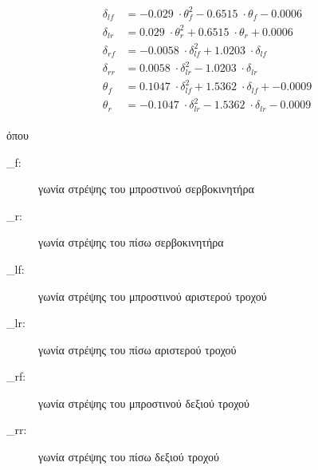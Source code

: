
\begin{align}
\begin{split}
\delta_{lf} &= -0.029\;\cdot \theta_{f}^2 - 0.6515\;\cdot \theta_{f} - 0.0006\\
\delta_{lr} &= 0.029\;\cdot \theta_{r}^2 + 0.6515\;\cdot \theta_{r} + 0.0006\\
\delta_{rf} &= -0.0058\;\cdot \delta_{lf}^2 + 1.0203\;\cdot \delta_{lf}\\
\delta_{rr} &= 0.0058\;\cdot \delta_{lr}^2 - 1.0203\;\cdot \delta_{lr}\\
\theta_{f}\, &= 0.1047\;\cdot \delta_{lf}^2 + 1.5362\;\cdot \delta_{lf} + -0.0009\\
\theta_{r}\, &= -0.1047\;\cdot \delta_{lr}^2 - 1.5362\;\cdot \delta_{lr} - 0.0009
\end{split}
\label{eq:polynoms}
\end{align}

\bigskip
\noindent
όπου

\begin{description}
	\item[\theta_{f}:] γωνία στρέψης του μπροστινού σερβοκινητήρα
	\item[\theta_{r}:] γωνία στρέψης του πίσω σερβοκινητήρα
	\item[\delta_{lf}:] γωνία στρέψης του μπροστινού αριστερού τροχού
	\item[\delta_{lr}:] γωνία στρέψης του πίσω αριστερού τροχού
	\item[\delta_{rf}:] γωνία στρέψης του μπροστινού δεξιού τροχού
	\item[\delta_{rr}:] γωνία στρέψης του πίσω δεξιού τροχού
\end{description}

